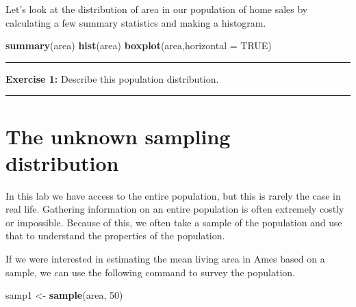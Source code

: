 \documentclass[]{book}
\newenvironment{Shaded}{\begin{snugshade}}{\end{snugshade}}
\newcommand{\KeywordTok}[1]{\textcolor[rgb]{0.13,0.29,0.53}{\textbf{{#1}}}}
\newcommand{\DataTypeTok}[1]{\textcolor[rgb]{0.13,0.29,0.53}{{#1}}}
\newcommand{\DecValTok}[1]{\textcolor[rgb]{0.00,0.00,0.81}{{#1}}}
\newcommand{\StringTok}[1]{\textcolor[rgb]{0.31,0.60,0.02}{{#1}}}
\newcommand{\OtherTok}[1]{\textcolor[rgb]{0.56,0.35,0.01}{{#1}}}
\newcommand{\NormalTok}[1]{{#1}}
\theoremstyle{definition}
\theoremstyle{definition}
\theoremstyle{definition}
\theoremstyle{remark}
\begin{document}
\begin{Shaded}
\end{Shaded}

Let's look at the distribution of area in our population of home sales
by calculating a few summary statistics and making a histogram.

\begin{Shaded}
\begin{Highlighting}[]
\KeywordTok{summary}\NormalTok{(area)}
\KeywordTok{hist}\NormalTok{(area)}
\KeywordTok{boxplot}\NormalTok{(area,}\DataTypeTok{horizontal =} \OtherTok{TRUE}\NormalTok{)}
\end{Highlighting}
\end{Shaded}

\begin{center}\rule{0.5\linewidth}{\linethickness}\end{center}

\textbf{Exercise 1:} Describe this population distribution.

\begin{center}\rule{0.5\linewidth}{\linethickness}\end{center}

\section{The unknown sampling
distribution}\label{the-unknown-sampling-distribution}

In this lab we have access to the entire population, but this is rarely
the case in real life. Gathering information on an entire population is
often extremely costly or impossible. Because of this, we often take a
sample of the population and use that to understand the properties of
the population.

If we were interested in estimating the mean living area in Ames based
on a sample, we can use the following command to survey the population.

\begin{Shaded}
\begin{Highlighting}[]
\NormalTok{samp1 <-}\StringTok{ }\KeywordTok{sample}\NormalTok{(area, }\DecValTok{50}\NormalTok{)}
\end{Highlighting}
\end{Shaded}
\end{document}
